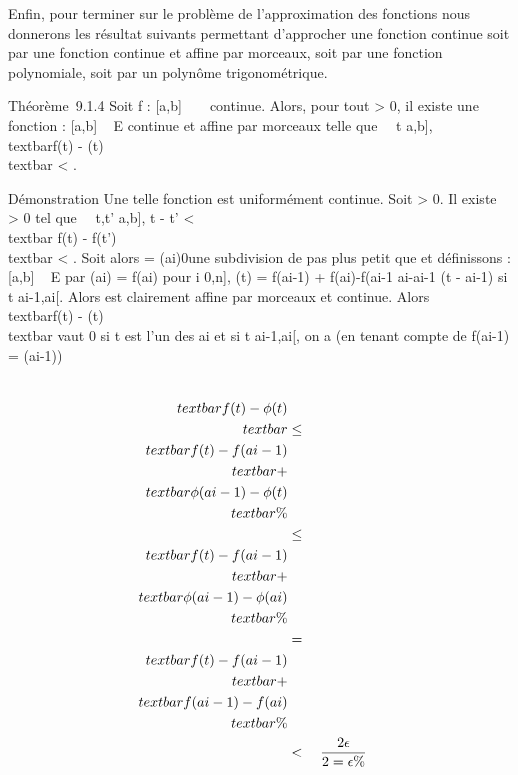 Enfin, pour terminer sur le problème de l'approximation des fonctions
nous donnerons les résultat suivants permettant d'approcher une fonction
continue soit par une fonction continue et affine par morceaux, soit par
une fonction polynomiale, soit par un polynôme trigonométrique.

Théorème~9.1.4 Soit f : {[}a,b{]} \rightarrow~ ~ continue. Alors, pour tout \epsilon
\textgreater{} 0, il existe une fonction \phi : {[}a,b{]} \rightarrow~ E continue et
affine par morceaux telle que \forall~~t \in {[}a,b{]},
\\textbar{}f(t) - \phi(t)\\textbar{}
\textless{} \epsilon.

Démonstration Une telle fonction est uniformément continue. Soit \epsilon
\textgreater{} 0. Il existe \eta \textgreater{} 0 tel que
\forall~~t,t' \in {[}a,b{]}, \textbar{}t - t'\textbar{}
\textless{} \eta \rigtharrow~\\textbar{} f(t) -
f(t')\\textbar{} \textless{} \epsilon {}
. Soit alors \sigma = (ai)0\leqi\leqn une subdivision de pas
plus petit que \eta et définissons \phi : {[}a,b{]} \rightarrow~ E par \phi(ai) =
f(ai) pour i \in {[}0,n{]}, \phi(t) = f(ai-1) +
f(ai)-f(ai-1 \over
ai-ai-1 (t - ai-1) si t
\in{]}ai-1,ai{[}. Alors \phi est clairement affine par
morceaux et continue. Alors \\textbar{}f(t) -
\phi(t)\\textbar{} vaut 0 si t est l'un des ai et
si t \in{]}ai-1,ai{[}, on a (en tenant compte de
f(ai-1) = \phi(ai-1))

\begin{align*} \\textbar{}f(t) -
\phi(t)\\textbar{}& \leq& \\textbar{}f(t) -
f(ai-1)\\textbar{} +\\textbar{}
\phi(ai-1) - \phi(t)\\textbar{} \%&
\\ & \leq& \\textbar{}f(t) -
f(ai-1)\\textbar{} +\\textbar{}
\phi(ai-1) - \phi(ai)\\textbar{}\%&
\\ & =& \\textbar{}f(t) -
f(ai-1)\\textbar{} +\\textbar{}
f(ai-1) - f(ai)\\textbar{}\%&
\\ & \textless{}& 2 \epsilon
\over 2 = \epsilon \%& \\
\end{align*}

